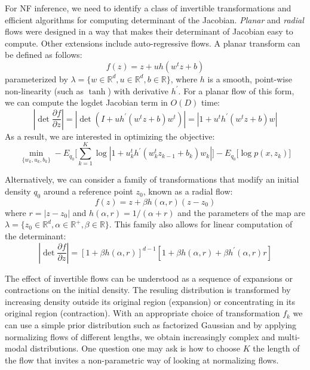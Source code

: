 For NF inference, we need to identify a class of invertible transformations and efficient algorithms for computing determinant of the Jacobian. \textit{Planar} and \textit{radial} flows were designed in a way that makes their determinant of Jacobian easy to compute. Other extensions include auto-regressive flows. A planar transform can be defined as follows:
\begin{equation}
    f(z) = z + uh(w^{t}z + b)
\end{equation}
parameterized by $\lambda = \{w \in \mathbb{R}^{d}, u \in \mathbb{R}^{d}, b \in \mathbb{R}\}$, where $h$ is a smooth, point-wise non-linearity (such as $\tanh$) with derivative $h^{\prime}$. For a planar flow of this form, we can compute the logdet Jacobian term in $O(D)$ time:
\begin{equation}
    |\det \frac{\partial f}{\partial z}| = |\det (I + uh^{\prime}(w^{t}z + b)w^{t})| = |1 + u^{t}h^{\prime}(w^{t}z + b)w|
\end{equation}
As a result, we are interested in optimizing the objective:
\begin{equation}
    \min_{\{w_k,u_k,b_k\}} - E_{q_0}\bigg[\sum_{k=1}^{K} \log |1 + u_{k}^{t}h^{\prime}(w_{k}^{t}z_{k-1} + b_k)w_k|\bigg] - E_{q_0}\bigg[\log p(x, z_k)\bigg]
\end{equation}

Alternatively, we can consider a family of transformations that modify an initial density $q_0$ around a reference point $z_0$, known as a radial flow:
\begin{equation}
    f(z) = z + \beta h(\alpha, r)(z-z_0)
\end{equation}
where $r = |z-z_0|$ and $h(\alpha, r) = 1/(\alpha + r)$ and the parameters of the map are $\lambda = \{z_0 \in \mathbb{R}^{d}, \alpha \in \mathbb{R}^{+}, \beta \in \mathbb{R}\}$. This family also allows for linear computation of the determinant:
\begin{equation}
    |\det \frac{\partial f}{\partial z}| = [1+\beta h(\alpha,r)]^{d-1}[1 + \beta h(\alpha,r) + \beta h^{\prime}(\alpha, r)r]
\end{equation}

The effect of invertible flows can be understood as a sequence of expansions or contractions on the initial density. The resuling distribution is transformed by increasing density outside its original region (expansion) or concentrating in its original region (contraction). With an appropriate choice of transformation $f_k$ we can use a simple prior distribution such as factorized Gaussian and by applying normalizing flows of different lengths, we obtain increasingly complex and multi-modal distributions. One question one may ask is how to choose $K$ the length of the flow that invites a non-parametric way of looking at normalizing flows.\\

